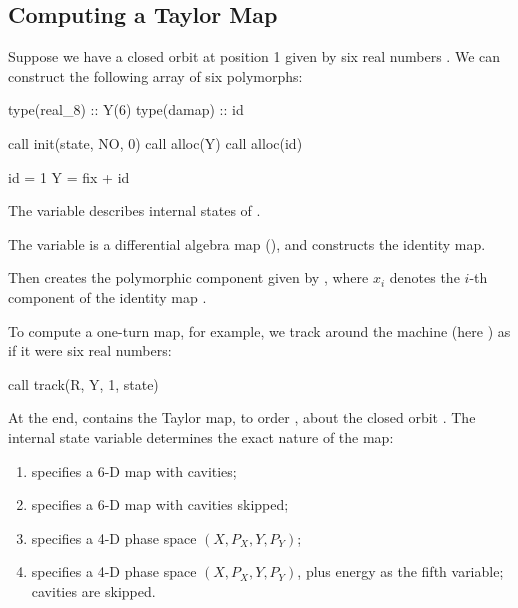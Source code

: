 \subsection{Computing a Taylor Map}

%
Suppose we have a closed orbit at position 1 given by six real numbers . We can construct the following array of six polymorphs:

\begin{ptccode}
type(real_8) :: Y(6)
type(damap) :: id

call init(state, NO, 0)
call alloc(Y)
call alloc(id)

id = 1
Y = fix + id
\end{ptccode}

The variable  describes internal states of \PTC.

The variable  is a differential algebra map (), and  constructs the identity map.

\makeussubscript
Then  creates the polymorphic component  given by , where $x_i$ denotes the $i$-th component of the identity map .
\makeusother

%
To compute a one-turn map, for example, we track  around the
machine (here ) as if it were six real numbers:

\begin{ptccode}
call track(R, Y, 1, state)
\end{ptccode}

%
\makeussubscript
At the end,  contains the Taylor map, to order , about the closed orbit . The internal state variable  determines the exact nature of the map:
\begin{enumerate}
  \item {} specifies a 6-D map with cavities;
  \item {} specifies a 6-D map with cavities skipped;
  \item {} specifies a 4-D phase space $(X, P_X, Y, P_Y)$;
  \item {} specifies a 4-D phase
space $(X, P_X, Y, P_Y)$, plus energy as the fifth variable; cavities are skipped.
\end{enumerate}
\makeusother

